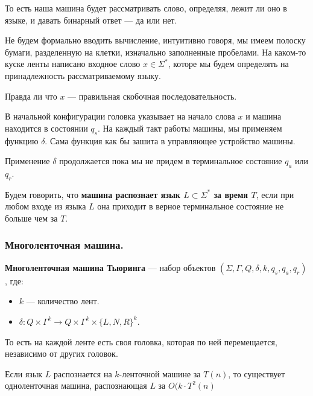 То есть наша машина будет рассматривать слово, определяя, лежит ли оно в языке, и давать бинарный ответ --- да или нет.

Не будем формально вводить вычисление, интуитивно говоря, мы имеем полоску бумаги, разделенную на клетки, изначально заполненные пробелами.
На каком-то куске ленты написано входное слово $x \in \Sigma^*$, которе мы будем определять на принадлежность рассматриваемому языку.

\begin{example}
   Правда ли что $x$ --- правильная скобочная последовательность.
\end{example}

В начальной конфигурации головка указывает на начало слова $x$ и машина находится в состоянии  $q_s$. 
На каждый такт работы машины, мы применяем функцию  $\delta$. Сама функция как бы зашита в управляющее устройство машины. 

Применение  $\delta$ продолжается пока мы не придем в терминальное состояние  $q_a$ или  $q_r$.

\begin{Def}
     Будем говорить, что \textbf{машина распознает язык $L \subset \Sigma^*$ за время $T$}, 
     если при любом входе из языка $L$ она приходит в верное терминальное состояние не больше чем за $T$. 
\end{Def}

\subsubsection{Многоленточная машина.}
\begin{Def}
    \textbf{Многоленточная машина Тьюринга} --- набор объектов $(\Sigma, \Gamma, Q, \delta, k, q_s, q_a, q_r)$, где:
    \begin{itemize}
        \item $k$ --- количество лент.
        \item $\delta: Q \times \Gamma^k \rightarrow Q \times \Gamma^k \times \{L, N, R\} ^ k$.
    \end{itemize}
\end{Def}

То есть на каждой ленте есть своя головка, которая по ней перемещается, независимо от других головок.

\begin{theorem}
    Если язык $L$ распознается на  $k$-ленточной машине за  $T(n)$, то существует одноленточная машина, распознающая $L$ за  $O(k \cdot T^2(n)$ 
\end{theorem}

